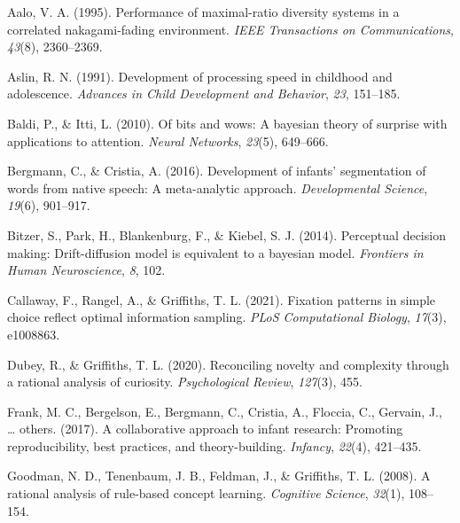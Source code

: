 \documentclass[10pt, letterpaper]{article}
\newenvironment{CSLReferences}%
  {}%
  {\par}
\begin{document}
\hypertarget{refs}{}
\begin{CSLReferences}{1}{0}
\leavevmode{}%
Aalo, V. A. (1995). Performance of maximal-ratio diversity systems in a
correlated nakagami-fading environment. \emph{IEEE Transactions on
Communications}, \emph{43}(8), 2360--2369.

\leavevmode{}%
Aslin, R. N. (1991). Development of processing speed in childhood and
adolescence. \emph{Advances in Child Development and Behavior},
\emph{23}, 151--185.

\leavevmode{}%
Baldi, P., \& Itti, L. (2010). Of bits and wows: A bayesian theory of
surprise with applications to attention. \emph{Neural Networks},
\emph{23}(5), 649--666.

\leavevmode{}%
Bergmann, C., \& Cristia, A. (2016). Development of infants'
segmentation of words from native speech: A meta-analytic approach.
\emph{Developmental Science}, \emph{19}(6), 901--917.

\leavevmode{}%
Bitzer, S., Park, H., Blankenburg, F., \& Kiebel, S. J. (2014).
Perceptual decision making: Drift-diffusion model is equivalent to a
bayesian model. \emph{Frontiers in Human Neuroscience}, \emph{8}, 102.

\leavevmode{}%
Callaway, F., Rangel, A., \& Griffiths, T. L. (2021). Fixation patterns
in simple choice reflect optimal information sampling. \emph{PLoS
Computational Biology}, \emph{17}(3), e1008863.

\leavevmode{}%
Dubey, R., \& Griffiths, T. L. (2020). Reconciling novelty and
complexity through a rational analysis of curiosity. \emph{Psychological
Review}, \emph{127}(3), 455.

\leavevmode{}%
Frank, M. C., Bergelson, E., Bergmann, C., Cristia, A., Floccia, C.,
Gervain, J., \ldots{} others. (2017). A collaborative approach to infant
research: Promoting reproducibility, best practices, and
theory-building. \emph{Infancy}, \emph{22}(4), 421--435.

\leavevmode{}%
Goodman, N. D., Tenenbaum, J. B., Feldman, J., \& Griffiths, T. L.
(2008). A rational analysis of rule-based concept learning.
\emph{Cognitive Science}, \emph{32}(1), 108--154.


\end{CSLReferences}
\end{document}

